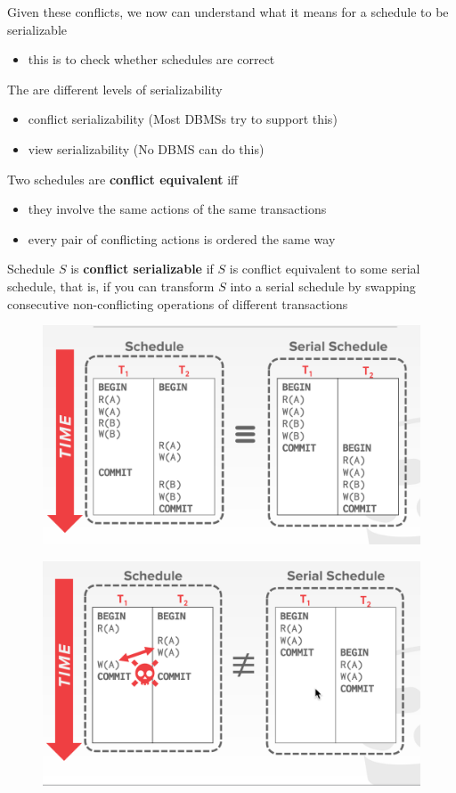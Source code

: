 \documentclass[11pt]{article}
\begin{document}
Given these conflicts, we now can understand what it means for a schedule to be serializable
\begin{itemize}
\item this is to check whether schedules are correct
\end{itemize}

The are different levels of serializability
\begin{itemize}
\item conflict serializability (Most DBMSs try to support this)
\item view serializability (No DBMS can do this)
\end{itemize}

Two schedules are \textbf{conflict equivalent} iff
\begin{itemize}
\item they involve the same actions of the same transactions
\item every pair of conflicting actions is ordered the same way
\end{itemize}

Schedule \(S\) is \textbf{conflict serializable} if \(S\) is conflict equivalent to some serial schedule,
that is, if you can transform \(S\) into a serial schedule by swapping consecutive
non-conflicting operations of different transactions

\begin{figure}[htbp]
\centering
\includegraphics[width=.7\textwidth]{../images/15445/52.png}
\label{}
\end{figure}

\begin{figure}[htbp]
\centering
\includegraphics[width=.7\textwidth]{../images/15445/53.png}
\label{}
\end{figure}
\end{document}
